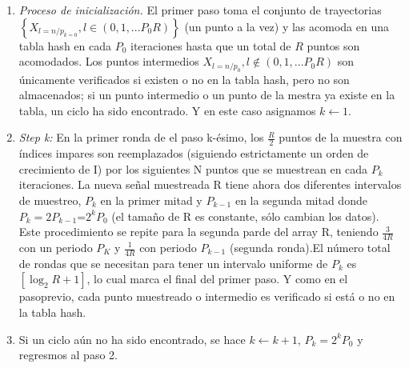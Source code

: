 \documentclass[10pt]{IEEEtran}
\begin{document}
\begin{enumerate}
\item \textit{Proceso de inicialización.} El primer paso toma el conjunto de trayectorias $\left\lbrace  X_{l=n/p_{k=0}}, l \in (0, 1, ... P_{0}R )  \right\rbrace$ (un punto a la vez) y las acomoda en una tabla hash en cada $P_{0}$ iteraciones hasta que un total de $R$ puntos son acomodados. Los puntos intermedios $ X_{l=n/p_{0}}, l \notin (0, 1, ... P_{0}R )  $  son únicamente verificados si existen o no en la tabla hash, pero no son almacenados; si un punto intermedio o un punto de la mestra ya existe en la tabla, un ciclo ha sido encontrado. Y en este caso asignamos $k \leftarrow 1$.
\item \textit{Step k:} En la primer ronda de el paso k-ésimo, los $\frac{R}{2}$ puntos de la muestra con índices impares son reemplazados (siguiendo estrictamente un orden de crecimiento de I) por los siguientes N puntos que se muestrean en cada $P_{k}$ iteraciones. La nueva señal muestreada R tiene ahora dos diferentes intervalos de muestreo, $P_{k}$ en la primer mitad y $P_{k-1}$ en la segunda mitad donde $P_{k}= 2P_{k-1}$=$2^{k}P_{0}$ (el tamaño de R es constante, sólo cambian los datos). Este procedimiento se repite para la segunda parde del array R, teniendo $\frac{3}{4R}$ con un periodo $P_{K}$ y  $\frac{1}{4R}$ con periodo $P_{k-1}$ (segunda ronda).El número total de rondas que se necesitan para tener un intervalo uniforme de $P_{k}$ es $\left[        \log_{2}R+1\right]$, lo cual marca el final del primer paso. Y como en el pasoprevio, cada punto muestreado o intermedio es verificado si está o no en la tabla hash.

\item Si un ciclo aún no ha sido encontrado, se hace $ k \leftarrow k+1$, $P_{k}= 2^{k}P_{0}$ y regresmos al paso 2. 
\end{enumerate}
\end{document}
